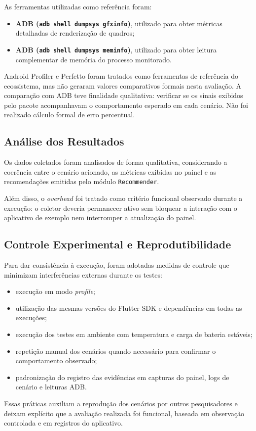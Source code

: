As ferramentas utilizadas como referência foram:

\begin{itemize}

\item \textbf{ADB (\texttt{adb shell dumpsys gfxinfo})}, utilizado para obter métricas detalhadas de renderização de quadros;

\item \textbf{ADB (\texttt{adb shell dumpsys meminfo})}, utilizado para obter leitura complementar de memória do processo monitorado.

\end{itemize}

Android Profiler e Perfetto foram tratados como ferramentas de referência do ecossistema, mas não geraram valores comparativos formais nesta avaliação. A comparação com ADB teve finalidade qualitativa: verificar se os sinais exibidos pelo pacote acompanhavam o comportamento esperado em cada cenário. Não foi realizado cálculo formal de erro percentual.

\subsection{Análise dos Resultados}

Os dados coletados foram analisados de forma qualitativa, considerando a coerência entre o cenário acionado, as métricas exibidas no painel e as recomendações emitidas pelo módulo \texttt{Recommender}.

Além disso, o \textit{overhead} foi tratado como critério funcional observado durante a execução: o coletor deveria permanecer ativo sem bloquear a interação com o aplicativo de exemplo nem interromper a atualização do painel.

\subsection{Controle Experimental e Reprodutibilidade}

Para dar consistência à execução, foram adotadas medidas de controle que minimizam interferências externas durante os testes:

\begin{itemize}

\item execução em modo \textit{profile};

\item utilização das mesmas versões do Flutter SDK e dependências em todas as execuções;

\item execução dos testes em ambiente com temperatura e carga de bateria estáveis;

\item repetição manual dos cenários quando necessário para confirmar o comportamento observado;

\item padronização do registro das evidências em capturas do painel, logs de cenário e leituras ADB.

\end{itemize}

Essas práticas auxiliam a reprodução dos cenários por outros pesquisadores e deixam explícito que a avaliação realizada foi funcional, baseada em observação controlada e em registros do aplicativo.
